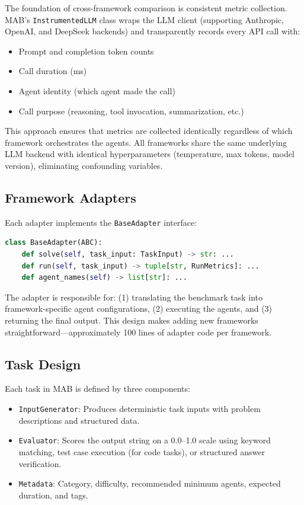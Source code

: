 \documentclass[sigconf,nonacm]{acmart}
\begin{document}
The foundation of cross-framework comparison is consistent metric collection. MAB's \texttt{InstrumentedLLM} class wraps the LLM client (supporting Anthropic, OpenAI, and DeepSeek backends) and transparently records every API call with:
\begin{itemize}
    \item Prompt and completion token counts
    \item Call duration (ms)
    \item Agent identity (which agent made the call)
    \item Call purpose (reasoning, tool invocation, summarization, etc.)
\end{itemize}

This approach ensures that metrics are collected identically regardless of which framework orchestrates the agents. All frameworks share the same underlying LLM backend with identical hyperparameters (temperature, max tokens, model version), eliminating confounding variables.

\subsection{Framework Adapters}

Each adapter implements the \texttt{BaseAdapter} interface:

\begin{lstlisting}[language=Python, basicstyle=\scriptsize\ttfamily, frame=single, breaklines=true, breakatwhitespace=false, xleftmargin=4pt, xrightmargin=4pt, columns=flexible]
class BaseAdapter(ABC):
    def solve(self, task_input: TaskInput) -> str: ...
    def run(self, task_input) -> tuple[str, RunMetrics]: ...
    def agent_names(self) -> list[str]: ...
\end{lstlisting}

The adapter is responsible for: (1) translating the benchmark task into framework-specific agent configurations, (2) executing the agents, and (3) returning the final output. This design makes adding new frameworks straightforward—approximately 100 lines of adapter code per framework.

\subsection{Task Design}

Each task in MAB is defined by three components:
\begin{itemize}
    \item \texttt{InputGenerator}: Produces deterministic task inputs with problem descriptions and structured data.
    \item \texttt{Evaluator}: Scores the output string on a 0.0--1.0 scale using keyword matching, test case execution (for code tasks), or structured answer verification.
    \item \texttt{Metadata}: Category, difficulty, recommended minimum agents, expected duration, and tags.
\end{itemize}
\end{document}
